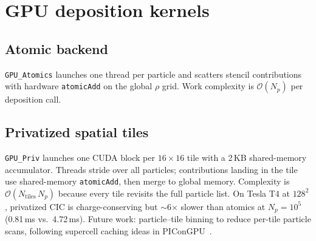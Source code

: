 \section{GPU deposition kernels}
\label{app:gpu}

\subsection{Atomic backend}
\texttt{GPU\_Atomics} launches one thread per particle and scatters stencil contributions with hardware \texttt{atomicAdd} on the global $\rho$ grid.
Work complexity is $\mathcal{O}(N_p)$ per deposition call.

\subsection{Privatized spatial tiles}
\texttt{GPU\_Priv} launches one CUDA block per $16\times16$ tile with a 2\,KB shared-memory accumulator.
Threads stride over all particles; contributions landing in the tile use shared-memory \texttt{atomicAdd}, then merge to global memory.
Complexity is $\mathcal{O}(N_{\mathrm{tiles}}\,N_p)$ because every tile revisits the full particle list.
On Tesla T4 at $128^2$, privatized CIC is charge-conserving but $\sim$6$\times$ slower than atomics at $N_p=10^5$ (0.81\,ms vs.\ 4.72\,ms).
Future work: particle--tile binning to reduce per-tile particle scans, following supercell caching ideas in PIConGPU~\cite{burau2010}.
